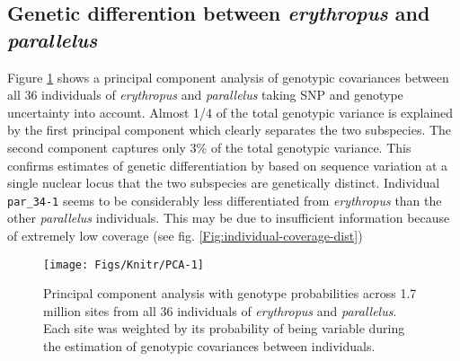 \documentclass[a4paper,12pt,times,authoryear,twoside,print,index]{Classes/PhDThesisPSnPDF}\usepackage[]{graphicx}\usepackage[]{color}
\newenvironment{knitrout}{}{} %
\begin{document}
\subsection{Genetic differention between \textit{erythropus} and \textit{parallelus}}
%
%
Figure \ref{Fig:PCA} shows a principal component analysis of genotypic covariances between all 36 individuals of \textit{erythropus} and \textit{parallelus} taking SNP and genotype uncertainty into account. Almost 1/4 of the total genotypic variance is explained by the first principal component which clearly separates the two subspecies. The second component captures only 3\% of the total genotypic variance. This confirms estimates of genetic differentiation by \cite{Cooper1995} based on sequence variation at a single nuclear locus that the two subspecies are genetically distinct. Individual \texttt{par\_34-1} seems to be considerably less differentiated from \textit{erythropus} than the other \textit{parallelus} individuals. This may be due to insufficient information because of extremely low coverage (see fig. \ref{Fig:individual-coverage-dist})
%
\begin{figure}[htb!]
\centering
\begin{knitrout}
\color{fgcolor}

{\centering \texttt{[image: Figs/Knitr/PCA-1]} 

}



\end{knitrout}
\caption{Principal component analysis with genotype probabilities across 1.7 million sites from all 36 individuals of \textit{erythropus} and \textit{parallelus}. Each site was weighted by its probability of being variable during the estimation of genotypic covariances between individuals.}
\label{Fig:PCA}
\end{figure}
%
\end{document}
